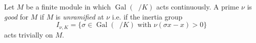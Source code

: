 \documentclass[paper=a4, fontsize=11pt]{scrartcl}
\DeclareMathOperator{\Gal}{\text{Gal}}
\DeclareMathOperator{\Kbar}{\overline{K}}
\numberwithin{equation}{section}
\numberwithin{figure}{section}
\numberwithin{table}{section}
\begin{document}
Let $M$ be a finite module in which $\Gal(\Kbar/K)$ acts continuously. A prime $\nu$ is \textit{good} for $M$ if $M$ is \textit{unramified} at $\nu$ i.e. if the inertia group 
$$I_{\nu,K}=\{\sigma\in \Gal(\Kbar/K)\text{ with }\nu(\sigma x-x)>0\}$$
acts trivially on $M$.
\end{document}
